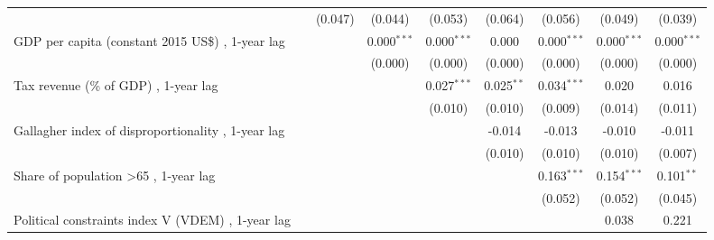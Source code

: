\begin{table}[htbp]
\begin{tabular}{lcccccccc}
                                                                                                   &                & (0.047)       & (0.044)       & (0.053)       & (0.064)      & (0.056)       & (0.049)       & (0.039)\\   
      GDP per capita (constant 2015 US\$) , 1-year lag                                             &                &               & 0.000$^{***}$ & 0.000$^{***}$ & 0.000        & 0.000$^{***}$ & 0.000$^{***}$ & 0.000$^{***}$\\   
                                                                                                   &                &               & (0.000)       & (0.000)       & (0.000)      & (0.000)       & (0.000)       & (0.000)\\   
      Tax revenue (\% of GDP) , 1-year lag                                                         &                &               &               & 0.027$^{***}$ & 0.025$^{**}$ & 0.034$^{***}$ & 0.020         & 0.016\\   
                                                                                                   &                &               &               & (0.010)       & (0.010)      & (0.009)       & (0.014)       & (0.011)\\   
      Gallagher index of disproportionality , 1-year lag                                           &                &               &               &               & -0.014       & -0.013        & -0.010        & -0.011\\   
                                                                                                   &                &               &               &               & (0.010)      & (0.010)       & (0.010)       & (0.007)\\   
      Share of population >65 , 1-year lag                                                         &                &               &               &               &              & 0.163$^{***}$ & 0.154$^{***}$ & 0.101$^{**}$\\   
                                                                                                   &                &               &               &               &              & (0.052)       & (0.052)       & (0.045)\\   
      Political constraints index V (VDEM) , 1-year lag                                            &                &               &               &               &              &               & 0.038         & 0.221\\   

\end{tabular}
\end{table}
